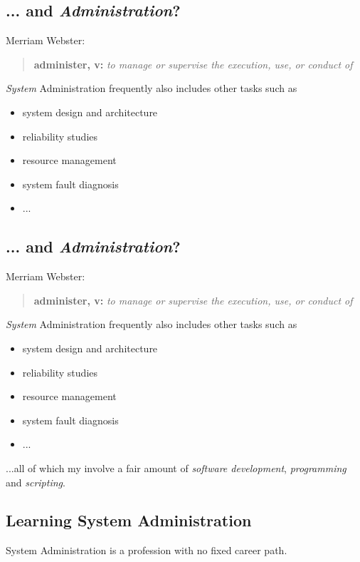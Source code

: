 \documentclass[xga]{xdvislides}
\begin{document}
\subsection{... and {\em Administration}?} Merriam Webster: \begin{quote} {\bf
administer, v:} {\em to manage or supervise the execution, use, or conduct of}
\\ \end{quote}

{\em System} Administration frequently also includes other tasks such as
\begin{itemize}
	\item system design and architecture
	\item reliability studies
	\item resource management
	\item system fault diagnosis
	\item ...
\end{itemize}


\subsection{... and {\em Administration}?}
Merriam Webster:
\begin{quote}
	{\bf administer, v:} {\em to manage or supervise the execution, use, or conduct of} \\
\end{quote}

{\em System} Administration frequently also includes other tasks such as
\begin{itemize}
	\item system design and architecture
	\item reliability studies
	\item resource management
	\item system fault diagnosis
	\item ...
\end{itemize}
\vspace{.5in}

...all of which my involve a fair amount of {\em software development}, {\em
programming} and {\em scripting}.

\subsection{Learning System Administration}
System Administration is a profession with no fixed career path.
\end{document}
